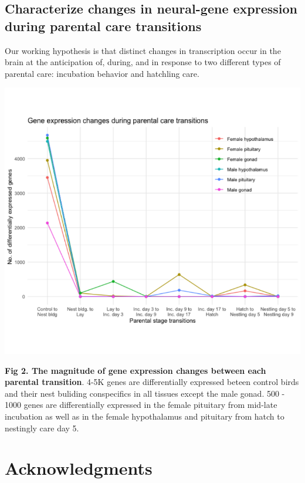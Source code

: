 \documentclass[10pt,letterpaper]{article}
\begin{document}
\hypertarget{characterize-changes-in-neural-gene-expression-during-parental-care-transitions}{%
\subsection{Characterize changes in neural-gene expression during
parental care
transitions}\label{characterize-changes-in-neural-gene-expression-during-parental-care-transitions}}

Our working hypothesis is that distinct changes in transcription occur
in the brain at the anticipation of, during, and in response to two
different types of parental care: incubation behavior and hatchling
care.

\includegraphics{characterization_manuscript_files/figure-latex/unnamed-chunk-4-1.pdf}

\textbf{Fig 2. The magnitude of gene expression changes between each
parental transition}. 4-5K genes are differentially expressed beteen
control birds and their nest buliding conspecifics in all tissues except
the male gonad. 500 - 1000 genes are differentially expressed in the
female pituitary from mid-late incubation as well as in the female
hypothalamus and pituitary from hatch to nestingly care day 5.

\hypertarget{acknowledgments}{%
\section{Acknowledgments}\label{acknowledgments}}
\end{document}
